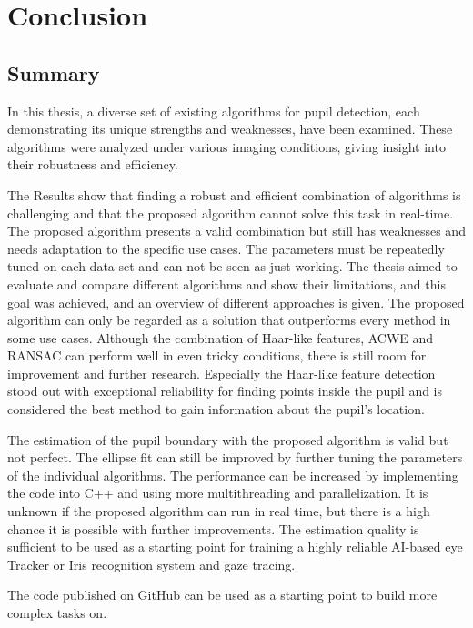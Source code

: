 \chapter{Conclusion}
\label{chap:conclusion}
\section{Summary}
\label{sec:summary}
In this thesis, a diverse set of existing algorithms for pupil detection, each demonstrating its unique strengths and weaknesses, have been examined. These algorithms were analyzed under various imaging conditions, giving insight into their robustness and efficiency.

The Results show that finding a robust and efficient combination of algorithms is challenging and that the proposed algorithm cannot solve this task in real-time. The proposed algorithm presents a valid combination but still has weaknesses and needs adaptation to the specific use cases. The parameters must be repeatedly tuned on each data set and can not be seen as just working. The thesis aimed to evaluate and compare different algorithms and show their limitations, and this goal was achieved, and an overview of different approaches is given. The proposed algorithm can only be regarded as a solution that outperforms every method in some use cases.
Although the combination of Haar-like features, ACWE and RANSAC can perform well in even tricky conditions, there is still room for improvement and further research. Especially the Haar-like feature detection stood out with exceptional reliability for finding points inside the pupil and is considered the best method to gain information about the pupil's location.

The estimation of the pupil boundary with the proposed algorithm is valid but not perfect. The ellipse fit can still be improved by further tuning the parameters of the individual algorithms. The performance can be increased by implementing the code into C++ and using more multithreading and parallelization. It is unknown if the proposed algorithm can run in real time, but there is a high chance it is possible with further improvements. The estimation quality is sufficient to be used as a starting point for training a highly reliable AI-based eye Tracker or Iris recognition system and gaze tracing.  

The code published on GitHub can be used as a starting point to build more complex tasks on.  